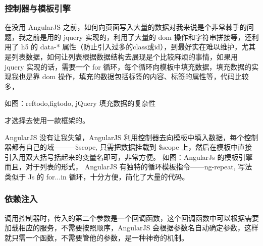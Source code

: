 \documentclass[UTF8]{ctexbook}
\begin{document}
{{            \subsubsection{控制器与模板引擎}
              \label{subsubsec:控制器与模板引擎}
                在没用 AngularJS 之前，如何向页面写入大量的数据对我来说是个非常棘手的问题，我之前是用的 jquery 实现的，利用了大量的 dom 操作和字符串拼接等，还利用了 h5 的 data-* 属性（防止引入过多的class或id），到最好实在难以维护，尤其是列表数据，如何让列表根据数据结构去展现是个比较麻烦的事情，如果用 jquery 实现的话，需要一个 for 循环，每个循环向模板中填充数据，填充数据的实现我也是靠 dom 操作，填充的数据包括标签的内容、标签的属性等，代码比较多，

                如图：reftodo,figtodo, jQuery 填充数据的复杂性

                才选择去使用一款框架的。
                \par
                AngularJS 没有让我失望，AngularJS 利用控制器去向模板中填入数据，每个控制器都有自己的域———\$scope, 只需把数据挂载到 \$scope 上，然后在模板中直接引入用双大括号括起来的变量名即可，非常方便。
                如图：AngularJs 的模板引擎
                而且，对于列表的形式， AngularJS 有独特的循环模板指令——ng-repeat, 写法类似于 Js 的 for...in 循环，十分方便，简化了大量的代码。

            \subsubsection{依赖注入}
              \label{subsubsec:依赖注入}
                调用控制器时，传入的第二个参数是一个回调函数，这个回调函数中可以根据需要加载相应的服务，不需要按照顺序，AngularJS 会根据参数名自动确定参数，这样就只需一个函数，不需要管他的参数，是一种神奇的机制。

}}
\end{document}
